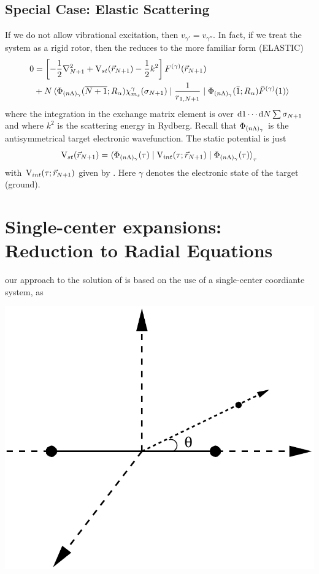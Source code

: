 \documentclass[aps,pra,groupedaddress,12pt,
               amsfonts,amssymb,
               preprint
    ]{revtex4}
\begin{document}
\subsection{Special Case: Elastic Scattering}
If we do not allow vibrational excitation, then $v_{\gamma'} =
v_{\gamma''}$. In fact, if we treat the system as a rigid rotor, then the
 reduces to the more familiar form (ELASTIC)
\begin{equation}
  \label{eq:essc}
  \begin{split}
    0 &= \left[-\dfrac{1}{2}\nabla^2_{N+1}+\mathrm{V}_{st}(\vec{r}_{N+1})-\dfrac{1}{2}k^2\right]F^{(\gamma)}(\vec{r}_{N+1}) \\
      &+N\mathinner{\langle{{\Phi_{(n\Lambda)_\gamma}(\overline{N+1};R_\alpha)\chi_{m_s}^{\gamma}(\sigma_{N+1})} \mid {\dfrac{1}{r_{1,N+1}}} \mid {\Phi_{(n\Lambda)_\gamma}(\bar{1};R_\alpha)\bar{F}^{(\gamma)}(1)}}\rangle}
  \end{split}
\end{equation}
where the integration in the exchange matrix element is over $\mathrm{d}
1\cdots \mathrm{d} N\sum\sigma_{N+1}$ and where $k^2$ is the scattering energy
in Rydberg. Recall that $\Phi_{(n\Lambda)_\gamma}$ is the antisymmetrical target electronic
wavefunction. The static potential is just
\begin{equation}
  \label{eq:vstel}
  \mathrm{V}_{st}(\vec{r}_{N+1}) = \mathinner{\langle{{\Phi_{(n\Lambda)_\gamma}(\tau)} \mid {\mathrm{V}_{int}(\tau;\vec{r}_{N+1})} \mid {\Phi_{(n\Lambda)_\gamma}(\tau)}}\rangle}_\tau
\end{equation}
with $\mathrm{V}_{int}(\tau;\vec{r}_{N+1})$ given by . Here $\gamma$
denotes the electronic state of the target (ground).

\section{Single-center expansions: Reduction to Radial Equations}
\label{sec:single-cent-expans}
our approach to the solution of  is based on the use of a
single-center coordiante system, as
\begin{center}
 \includegraphics[scale=0.5]{sce.pdf}
\end{center}
\end{document}
